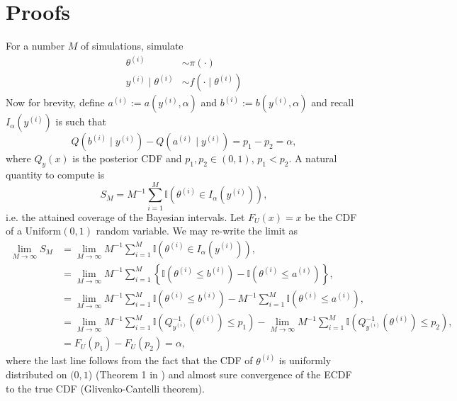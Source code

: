 \documentclass[oneside]{article}
\begin{document}
\newpage
\appendix

\section{Proofs}
\label{appendix::sec:proofs}

For a number $M$ of simulations, simulate
$$
\begin{align}
\theta^{(i)} &\sim \pi(\cdot) \\
y^{(i)} \mid \theta^{(i)} &\sim f(\cdot \mid \theta^{(i)})
\end{align}
$$
Now  for brevity, define $a^{(i)} := a(y^{(i)}, \alpha)$ and $b^{(i)} := b(y^{(i)}, \alpha)$ and recall $I_{\alpha}\left(y^{(i)}\right)$ is such that 
$$
Q\left(b^{(i)} \mid y^{(i)}\right) - Q\left(a^{(i)} \mid y^{(i)}\right) = p_1 - p_2 = \alpha,
$$
where $Q_{y}(x)$ is the posterior CDF and $p_1, p_2 \in (0,1)$, $p_1 < p_2$.
A natural quantity to compute is
$$
S_M = M^{-1}\sum_{i=1}^M \mathbb{I}\left(\theta^{(i)} \in I_{\alpha}\left(y^{(i)}\right) \right),
$$
i.e. the attained coverage of the Bayesian intervals.
Let $F_U(x) = x$ be the CDF of a $\operatorname{Uniform(0, 1)}$ random variable. 
We may re-write the limit as
$$
\begin{align}
\lim_{M \to \infty} S_M &= \lim_{M \to \infty} M^{-1}\sum_{i=1}^M \mathbb{I}\left(\theta^{(i)} \in I_{\alpha}\left(y^{(i)}\right) \right),\\
&=  \lim_{M \to \infty} M^{-1}\sum_{i=1}^M \left\{ \mathbb{I}\left(\theta^{(i)} \leq b^{(i)} \right) - \mathbb{I}\left(\theta^{(i)} \leq a^{(i)} \right) \right\},\\
&=  \lim_{M \to \infty} M^{-1}\sum_{i=1}^M \mathbb{I}\left(\theta^{(i)} \leq b^{(i)} \right) -  M^{-1}\sum_{i=1}^M\mathbb{I}\left(\theta^{(i)} \leq a^{(i)} \right),\\
&=  \lim_{M \to \infty} M^{-1}\sum_{i=1}^M \mathbb{I}\left(Q_{y^{(i)}}^{-1}\left(\theta^{(i)}\right) \leq p_1 \right) -   \lim_{M \to \infty} M^{-1}\sum_{i=1}^M\mathbb{I}\left(Q_{y^{(i)}}^{-1}\left(\theta^{(i)}\right) \leq p_2 \right),\\
&= F_U(p_1) - F_U(p_2) = \alpha,
\end{align}
$$
where the last line follows from the fact that the CDF of $\theta^{(i)}$ is uniformly distributed on $(0, 1$) (Theorem 1 in \cite{Cook2006}) and almost sure convergence of the ECDF to the true CDF (Glivenko-Cantelli theorem).
\end{document}
